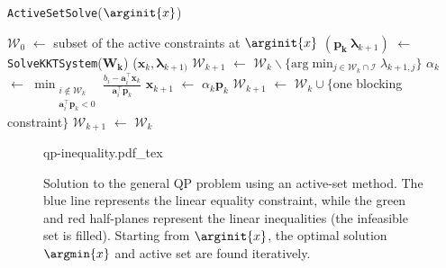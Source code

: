 \begin{algorithm}
\caption{\texttt{ActiveSetSolve}($\arginit{x}$)}
\label{alg:chap3-active-set}
\begin{algorithmic}
\STATE $\mathcal{W}_0$ $\leftarrow$ subset of the active constraints at $\arginit{x}$
\STATE $(\mathbf{p_k}~\boldsymbol{\lambda}_{k+1})$ $\leftarrow$ \texttt{SolveKKTSystem}($\mathbf{W_k}$)
\RETURN ($\mathbf{x}_k,\boldsymbol{\lambda}_{k+1)}$
\ELSE
{}
\STATE $\mathcal{W}_{k+1}$ $\leftarrow$ $\mathcal{W}_k \backslash \{\text{arg}\min_{j\in\mathcal{W}_k\cap\mathcal{I}}\lambda_{k+1,j}\}$
\ENDIF
\ELSE
{}
\STATE $\alpha_k$ $\leftarrow$ $\min_{\substack{i\notin\mathcal{W}_k\\\mathbf{a}_i^{\top}\mathbf{p}_k<0}} \frac{b_i-\mathbf{a}_i^{\top}\mathbf{x}_k}{\mathbf{a}_i^{\top}\mathbf{p}_k}$
\STATE $\mathbf{x}_{k+1}$ $\leftarrow$ $\alpha_k\mathbf{p}_k$
\STATE $\mathcal{W}_{k+1}$ $\leftarrow$ $\mathcal{W}_k\cup\{$one blocking constraint$\}$
\ELSE
{}
\STATE $\mathcal{W}_{k+1}$ $\leftarrow$ $\mathcal{W}_k$
\ENDIF
\ENDIF
\ENDFOR
\end{algorithmic}
\end{algorithm}

\begin{figure}
  \centering
      {\def\svgwidth{0.8\linewidth}
        {\footnotesize
          
                     {qp-inequality.pdf_tex}
        }
      }
      \caption{Solution to the general QP problem using an active-set
        method. The blue line represents the linear equality
        constraint, while the green and red half-planes represent the
        linear inequalities (the infeasible set is filled). Starting
        from $\arginit{x}$, the optimal solution $\argmin{x}$ and
        active set are found iteratively.}
      \label{fig:chap3-qp-inequality}
\end{figure}

